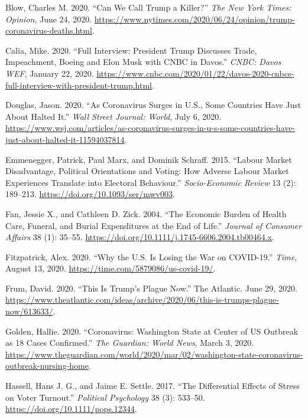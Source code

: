 \documentclass[
  12pt,
]{article}
\newlength{\cslhangindent}
\newenvironment{cslreferences}%
  {\setlength{\parindent}{0pt}%
  \everypar{\setlength{\hangindent}{\cslhangindent}}\ignorespaces}%
  {\par}
\begin{document}
\hypertarget{refs}{}
\begin{cslreferences}
\leavevmode\hypertarget{ref-Blow2020}{}%
Blow, Charles M. 2020. ``Can We Call Trump a Killer?'' \emph{The New York Times: Opinion}, June 24, 2020. \url{https://www.nytimes.com/2020/06/24/opinion/trump-coronavirus-deaths.html}.

\leavevmode\hypertarget{ref-Calia2020}{}%
Calia, Mike. 2020. ``Full Interview: President Trump Discusses Trade, Impeachment, Boeing and Elon Musk with CNBC in Davos.'' \emph{CNBC: Davos WEF}, January 22, 2020. \url{https://www.cnbc.com/2020/01/22/davos-2020-cnbcs-full-interview-with-president-trump.html}.

\leavevmode\hypertarget{ref-Douglas2020}{}%
Douglas, Jason. 2020. ``As Coronavirus Surges in U.S., Some Countries Have Just About Halted It.'' \emph{Wall Street Journal: World}, July 6, 2020. \url{https://www.wsj.com/articles/as-coronavirus-surges-in-u-s-some-countries-have-just-about-halted-it-11594037814}.

\leavevmode\hypertarget{ref-Emmenegger2015}{}%
Emmenegger, Patrick, Paul Marx, and Dominik Schraff. 2015. ``Labour Market Disadvantage, Political Orientations and Voting: How Adverse Labour Market Experiences Translate into Electoral Behaviour.'' \emph{Socio-Economic Review} 13 (2): 189--213. \url{https://doi.org/10.1093/ser/mwv003}.

\leavevmode\hypertarget{ref-Fan2004}{}%
Fan, Jessie X., and Cathleen D. Zick. 2004. ``The Economic Burden of Health Care, Funeral, and Burial Expenditures at the End of Life.'' \emph{Journal of Consumer Affairs} 38 (1): 35--55. \url{https://doi.org/10.1111/j.1745-6606.2004.tb00464.x}.

\leavevmode\hypertarget{ref-Fitzpatrick2020}{}%
Fitzpatrick, Alex. 2020. ``Why the U.S. Is Losing the War on COVID-19.'' \emph{Time}, August 13, 2020. \url{https://time.com/5879086/us-covid-19/}.

\leavevmode\hypertarget{ref-Frum2020}{}%
Frum, David. 2020. ``This Is Trump's Plague Now.'' The Atlantic. June 29, 2020. \url{https://www.theatlantic.com/ideas/archive/2020/06/this-is-trumps-plague-now/613633/}.

\leavevmode\hypertarget{ref-Golden2020}{}%
Golden, Hallie. 2020. ``Coronavirus: Washington State at Center of US Outbreak as 18 Cases Confirmed.'' \emph{The Guardian: World News}, March 3, 2020. \url{https://www.theguardian.com/world/2020/mar/02/washington-state-coronavirus-outbreak-nursing-home}.

\leavevmode\hypertarget{ref-Hassell2017}{}%
Hassell, Hans J. G., and Jaime E. Settle. 2017. ``The Differential Effects of Stress on Voter Turnout.'' \emph{Political Psychology} 38 (3): 533--50. \url{https://doi.org/10.1111/pops.12344}.


\end{cslreferences}
\end{document}
